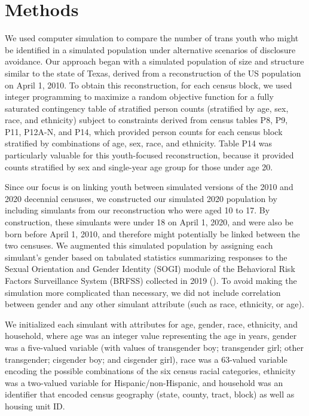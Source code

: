 \documentclass{jpc} %
\theoremstyle{plain}\newtheorem{satz}[thm]{Satz} %
\begin{document}
 \section*{Methods}

We used computer simulation to compare the number of trans youth who might be identified in a simulated population under alternative scenarios of disclosure avoidance.  Our approach began with a simulated population of size and structure similar to the state of Texas, derived from a reconstruction of the US population on April 1, 2010.  To obtain this reconstruction, for each census block, we used integer programming to maximize a random objective function for a fully saturated contingency table of stratified person counts (stratified by age, sex, race, and ethnicity) subject to constraints derived from census tables P8, P9, P11, P12A-N, and P14, which provided person counts for each census block stratified by combinations of age, sex, race, and ethnicity.  Table P14 was particularly valuable for this youth-focused reconstruction, because it provided counts stratified by sex and single-year age group for those under age 20.

Since our focus is on linking youth between simulated versions of the 2010 and 2020 decennial censuses, we constructed our simulated 2020 population by including simulants from our reconstruction who were aged 10 to 17.  By construction, these simulants were under 18 on April 1, 2020, and were also be born before April 1, 2010, and therefore might potentially be linked between the two censuses.  We augmented this simulated population by assigning each simulant's gender based on tabulated statistics summarizing responses to the Sexual Orientation and Gender Identity (SOGI) module of the Behavioral Risk Factors Surveillance System (BRFSS) collected in 2019 (\cite{brfss2019}). To avoid making the simulation more complicated than necessary, we did not include correlation between gender and any other simulant attribute (such as race, ethnicity, or age).

We initialized each simulant with attributes for age, gender, race, ethnicity, and household, where age was an integer value representing the age in years, gender was a five-valued variable (with values of transgender boy; transgender girl; other transgender; cisgender boy; and cisgender girl), race was a 63-valued variable encoding the possible combinations of the six census racial categories, ethnicity was a two-valued variable for Hispanic/non-Hispanic, and household was an identifier that encoded census geography (state, county, tract, block) as well as housing unit ID.
\end{document}
